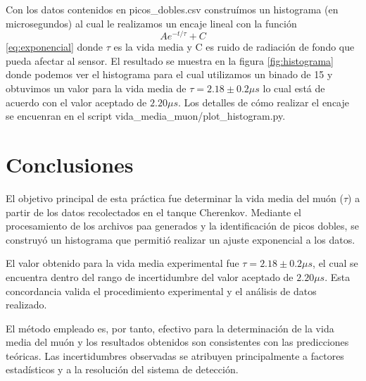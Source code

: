\documentclass[twocolumn,a4paper,11pt]{scrartcl}
\begin{document}
Con los datos contenidos en picos\_dobles.csv construímos un histograma (en microsegundos) al cual le realizamos un encaje lineal con la función $$Ae^{-t/\tau} + C$$ \ref{eq:exponencial} donde $\tau$ es la vida media y C es ruido de radiación de fondo que pueda afectar al sensor. El resultado se muestra en la figura \ref{fig:histograma} donde podemos ver el histograma para el cual utilizamos un binado de 15 y obtuvimos un valor para la vida media de $\tau =  2.18 \pm 0.2 \mu s$ lo cual está de acuerdo con el valor aceptado de $2.20 \mu s$. Los detalles de cómo realizar el encaje se encuenran en el script vida\_media\_muon/plot\_histogram.py.

\section{Conclusiones}

El objetivo principal de esta práctica fue determinar la vida media del muón ($\tau$) a partir de los datos recolectados en el tanque Cherenkov. Mediante el procesamiento de los archivos paa generados y la identificación de picos dobles, se construyó un histograma que permitió realizar un ajuste exponencial a los datos.

El valor obtenido para la vida media experimental fue $\tau = 2.18 \pm 0.2 \mu s$, el cual se encuentra dentro del rango de incertidumbre del valor aceptado de $2.20 \mu s$.  Esta concordancia valida el procedimiento experimental y el análisis de datos realizado.

El método empleado es, por tanto, efectivo para la determinación de la vida media del muón y los resultados obtenidos son consistentes con las predicciones teóricas.  Las incertidumbres observadas se atribuyen principalmente a factores estadísticos y a la resolución del sistema de detección.


 
\end{document}

